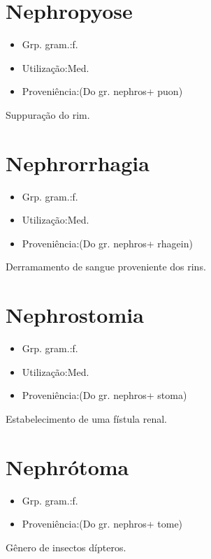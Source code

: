 \section{Nephropyose}
\begin{itemize}
\item {Grp. gram.:f.}
\end{itemize}
\begin{itemize}
\item {Utilização:Med.}
\end{itemize}
\begin{itemize}
\item {Proveniência:(Do gr. \textunderscore nephros\textunderscore  + \textunderscore puon\textunderscore )}
\end{itemize}
Suppuração do rim.
\section{Nephrorrhagia}
\begin{itemize}
\item {Grp. gram.:f.}
\end{itemize}
\begin{itemize}
\item {Utilização:Med.}
\end{itemize}
\begin{itemize}
\item {Proveniência:(Do gr. \textunderscore nephros\textunderscore  + \textunderscore rhagein\textunderscore )}
\end{itemize}
Derramamento de sangue proveniente dos rins.
\section{Nephrostomia}
\begin{itemize}
\item {Grp. gram.:f.}
\end{itemize}
\begin{itemize}
\item {Utilização:Med.}
\end{itemize}
\begin{itemize}
\item {Proveniência:(Do gr. \textunderscore nephros\textunderscore  + \textunderscore stoma\textunderscore )}
\end{itemize}
Estabelecimento de uma fístula renal.
\section{Nephrótoma}
\begin{itemize}
\item {Grp. gram.:f.}
\end{itemize}
\begin{itemize}
\item {Proveniência:(Do gr. \textunderscore nephros\textunderscore  + \textunderscore tome\textunderscore )}
\end{itemize}
Gênero de insectos dípteros.
